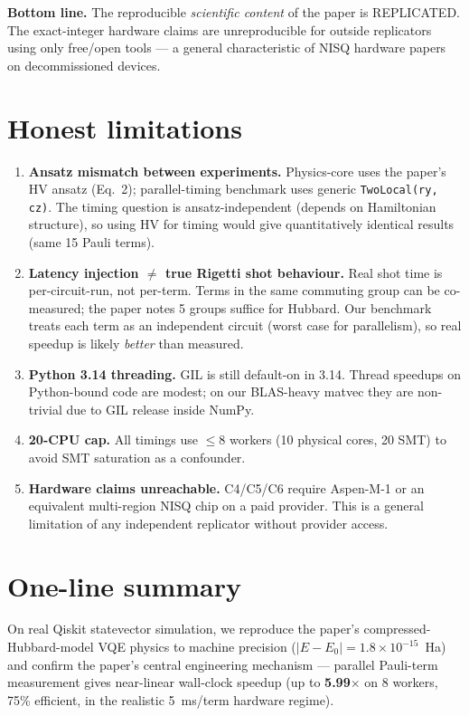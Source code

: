 \documentclass[11pt]{article}
\begin{document}
\textbf{Bottom line.} The reproducible \emph{scientific content} of the paper is REPLICATED. The exact-integer hardware claims are unreproducible for outside replicators using only free/open tools --- a general characteristic of NISQ hardware papers on decommissioned devices.

\section{Honest limitations}

\begin{enumerate}
  \item \textbf{Ansatz mismatch between experiments.} Physics-core uses the paper's HV ansatz (Eq.~2); parallel-timing benchmark uses generic \texttt{TwoLocal(ry, cz)}. The timing question is ansatz-independent (depends on Hamiltonian structure), so using HV for timing would give quantitatively identical results (same 15 Pauli terms).
  \item \textbf{Latency injection $\ne$ true Rigetti shot behaviour.} Real shot time is per-circuit-run, not per-term. Terms in the same commuting group can be co-measured; the paper notes 5 groups suffice for Hubbard. Our benchmark treats each term as an independent circuit (worst case for parallelism), so real speedup is likely \emph{better} than measured.
  \item \textbf{Python 3.14 threading.} GIL is still default-on in 3.14. Thread speedups on Python-bound code are modest; on our BLAS-heavy matvec they are non-trivial due to GIL release inside NumPy.
  \item \textbf{20-CPU cap.} All timings use $\leq 8$ workers (10 physical cores, 20 SMT) to avoid SMT saturation as a confounder.
  \item \textbf{Hardware claims unreachable.} C4/C5/C6 require Aspen-M-1 or an equivalent multi-region NISQ chip on a paid provider. This is a general limitation of any independent replicator without provider access.
\end{enumerate}

\section{One-line summary}

On real Qiskit statevector simulation, we reproduce the paper's compressed-Hubbard-model VQE physics to machine precision ($|E - E_0| = 1.8 \times 10^{-15}$~Ha) and confirm the paper's central engineering mechanism --- parallel Pauli-term measurement gives near-linear wall-clock speedup (up to \textbf{5.99$\times$} on 8 workers, 75\% efficient, in the realistic 5~ms/term hardware regime).


\end{document}

